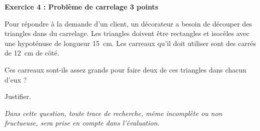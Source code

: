 \textbf{Exercice 4 : Problème de carrelage \hfill 3 points}

\medskip

Pour répondre à la demande d'un client, un décorateur a besoin de découper des triangles dans du carrelage. Les triangles doivent être rectangles et isocèles avec une hypoténuse de longueur 15~cm. Les carreaux qu'il doit utiliser sont des carrés de 12~cm de côté.

Ces carreaux sont-ils assez grands pour faire deux de ces triangles dans chacun d'eux ? 

Justifier.

\emph{Dans cette question, toute trace de recherche, même incomplète ou non fructueuse, sera prise en compte dans l'évaluation.}

\vspace{0,5cm}

